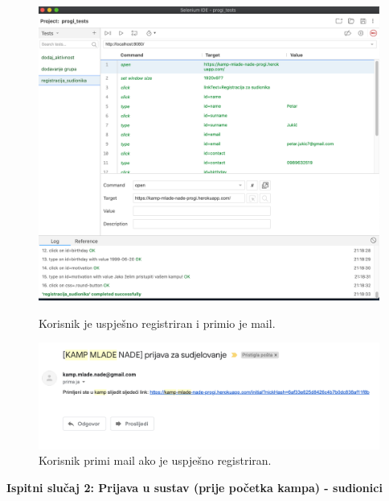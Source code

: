 			\begin{figure}[H]
            \includegraphics[scale=0.378]{dokumentacija/slike/REGISTRACIJA_TEST.png} %
            \centering
            \textbf{}
            
            Korisnik je uspješno registriran i primio je mail.
            \label{fig:promjene}
            \end{figure}
            
            \begin{figure}[H]
            \includegraphics[scale=0.5]{dokumentacija/slike/MAIL_PRIMLJEN_U_KAMP.png} %
            \centering
            Korisnik primi mail ako je uspješno registriran.
            \label{fig:promjene}
            \end{figure}
			
			\textbf{}
			\textbf{}
			\textbf{Ispitni slučaj 2: Prijava u sustav (prije početka kampa) - sudionici}
			
